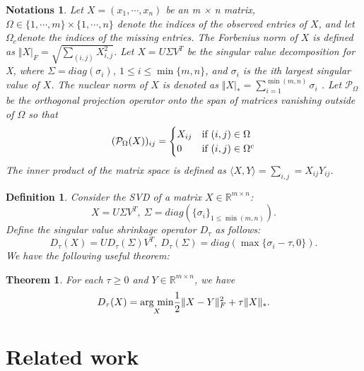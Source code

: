 \documentclass{article}
\newtheorem{definition}{Definition}[section]
\newtheorem{theorem}{Theorem}[section]
\newtheorem{notations}{Notations}
\begin{document}
{\begin{notations}
	Let $X = (x_1,\cdots, x_n)$ be an m × n matrix, $\Omega \in \{1,\cdots,m\}\times\{1,\cdots,n\}$ denote the indices of the observed
	entries of $X$, and let $\Omega_c$denote the indices of the missing entries. The Forbenius norm of $X$ is defined as $\Vert X \vert_F = \sqrt{\sum_{(i,j)} X^2_{i,j}}$. Let $X=U\Sigma V^T$ be the singular value decomposition for X, where $\Sigma = diag(\sigma_i)$, $1 \leq i\leq \min\{m,n\}$, and $\sigma_i$ is the ith largest singular value of $X$. The nuclear norm of $X$ is denoted as $\Vert X \vert_* = \sum_{i=1}^{\min(m,n)} \sigma_i$ . Let $\mathcal{P}_{\Omega}$ be the orthogonal projection operator onto the span of matrices vanishing outside of  $\Omega$ so that
	\begin{equation*}
		(\mathcal{P}_{\Omega}(X))_{ij} = \begin{cases}
		X_{ij} & \text{\rm if } (i,j) \in \Omega\\
		0 & \text{\rm if } (i,j) \in \Omega^c
	\end{cases}
	\end{equation*}
	The  inner product of the matrix space is defined as $ \langle X,Y\rangle = \sum_{i,j} = X_{ij}Y_{ij}$.
\end{notations}

\begin{definition}
	Consider the SVD of a matrix $X \in \mathbb{R}^{m \times n}$:
	\begin{equation}
		X = U \Sigma V^T, \ \Sigma = diag(\{\sigma_i\}_{1 \leq \min(m,n)}).
	\end{equation}
	Define the singular value shrinkage operator $D_{\tau}$ as follows:
	\begin{equation}
		D_{\tau}(X) = U D_{\tau}(\Sigma) V^T, \ D_{\tau}(\Sigma) = diag(\max\{\sigma_i-\tau,0\}).
	\end{equation}
	We have the following useful theorem:	
\end{definition}

\begin{theorem}
	\label{thm32}
	For each $\tau \geq 0$ and $Y \in \mathbb{R}^{m \times n}$, we have
	\begin{equation}
		D_{\tau}(X) = \underset{X}{\text{\rm arg min}} \frac{1}{2} \Vert X-Y\Vert_F^2 + \tau \Vert X \Vert_*.
	\end{equation} 
\end{theorem}

\section{Related work}
\label{s2}


}
\end{document}
